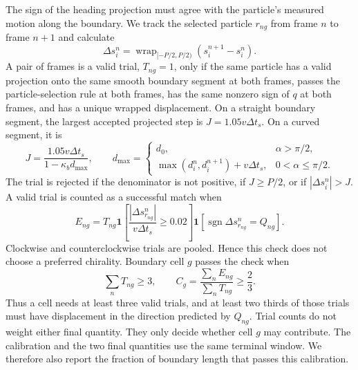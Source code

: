 \documentclass[11pt]{article}
\numberwithin{equation}{section}
\begin{document}
The sign of the heading projection must agree with the particle's measured
motion along the boundary.  We track the selected particle $r_{ng}$ from frame
$n$ to frame $n+1$ and calculate
\begin{equation}
  \Delta s_{i}^{n}
  =\operatorname{wrap}_{[-P/2,P/2)}
  \left(s_i^{n+1}-s_i^n\right).
  \label{eq:wrapped_boundary_increment}
\end{equation}
A pair of frames is a valid trial, $T_{ng}=1$, only if the same particle has a
valid projection onto the same smooth boundary segment at both frames, passes
the particle-selection rule at both frames, has the same nonzero sign of $q$ at
both frames, and has a unique wrapped displacement.  On a straight boundary
segment, the largest accepted projected step is
$J=1.05v\Delta t_s$.  On a curved segment, it is
\begin{equation}
  J=
  \frac{1.05v\Delta t_s}{1-\kappa_b d_{\max}},
  \qquad
  d_{\max}=\begin{cases}
  d_0,&\alpha>\pi/2,\\
  \max(d_i^n,d_i^{n+1})+v\Delta t_s,&0<\alpha\le\pi/2.
  \end{cases}
  \label{eq:projection_increment_bound}
\end{equation}
The trial is rejected if the denominator is not positive, if $J\ge P/2$, or if
$|\Delta s_i^n|>J$.  A valid trial is counted as a successful match when
\begin{equation}
  E_{ng}=T_{ng}
  \mathbf 1\left[
  \frac{|\Delta s_{r_{ng}}^n|}{v\Delta t_s}\ge0.02
  \right]
  \mathbf 1\left[
  \operatorname{sgn}\Delta s_{r_{ng}}^n=Q_{ng}
  \right].
  \label{eq:kinematic_calibration_success}
\end{equation}
Clockwise and counterclockwise trials are pooled.  Hence this check does not
choose a preferred chirality.  Boundary cell $g$ passes the check when
\begin{equation}
  \sum_nT_{ng}\ge3,
  \qquad
  C_g=\frac{\sum_nE_{ng}}{\sum_nT_{ng}}\ge\frac{2}{3}.
  \label{eq:kinematic_calibration_gate}
\end{equation}
Thus a cell needs at least three valid trials, and at least two thirds of those
trials must have displacement in the direction predicted by $Q_{ng}$.  Trial
counts do not weight either final quantity.  They only decide whether cell $g$
may contribute.  The calibration and the two final quantities use the same
terminal window.  We therefore also report the fraction of boundary length
that passes this calibration.
\end{document}
